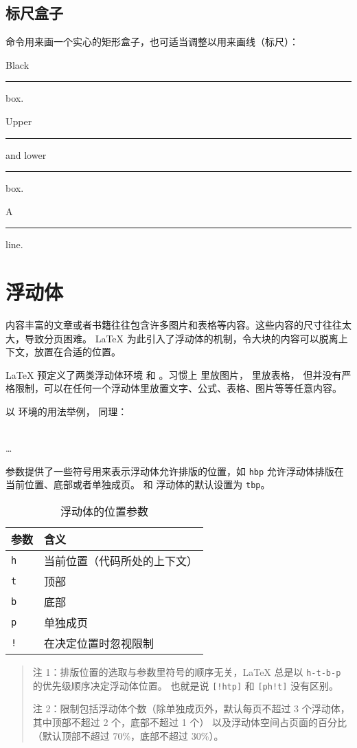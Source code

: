 \subsection{标尺盒子}\label{subsec:rules}

 命令用来画一个实心的矩形盒子，也可适当调整以用来画线（标尺）：
\begin{command}
\end{command}
\begin{example}
Black \rule{12pt}{4pt} box.

Upper \rule[4pt]{6pt}{8pt} and
lower \rule[-4pt]{6pt}{8pt} box.

A \rule[-.4pt]{3em}{.4pt} line.
\end{example}

\section{浮动体}\label{sec:float}

内容丰富的文章或者书籍往往包含许多图片和表格等内容。这些内容的尺寸往往太大，导致分页困难。
\LaTeX{} 为此引入了浮动体的机制，令大块的内容可以脱离上下文，放置在合适的位置。

\LaTeX{} 预定义了两类浮动体环境  和 。习惯上  里放图片， 里放表格，
但并没有严格限制，可以在任何一个浮动体里放置文字、公式、表格、图片等等任意内容。

以  环境的用法举例， 同理：
\begin{command}
 \\
\ldots \\
\end{command}

 参数提供了一些符号用来表示浮动体允许排版的位置，如 \texttt{hbp} 允许浮动体排版在当前位置、底部或者单独成页。
 和  浮动体的默认设置为 \texttt{tbp}。
\begin{table}[htp]
\centering
\caption{浮动体的位置参数}\label{tbl:float-placement}
\begin{tabular}{*{2}{l}}
 \hline
 \textbf{参数} & \textbf{含义} \\
 \hline
 \texttt{h} & 当前位置（代码所处的上下文） \\
 \texttt{t} & 顶部 \\
 \texttt{b} & 底部 \\
 \texttt{p} & 单独成页 \\
 \texttt{!} & 在决定位置时忽视限制 \\
 \hline
\end{tabular}
\begin{quote}\footnotesize
注 1：排版位置的选取与参数里符号的顺序无关，\LaTeX{} 总是以 \texttt{h-t-b-p} 的优先级顺序决定浮动体位置。
也就是说 \texttt{[!htp]} 和 \texttt{[ph!t]} 没有区别。\par
注 2：限制包括浮动体个数（除单独成页外，默认每页不超过 3 个浮动体，其中顶部不超过 2 个，底部不超过 1 个）
以及浮动体空间占页面的百分比（默认顶部不超过 70\%，底部不超过 30\%）。
\end{quote}
\end{table}

